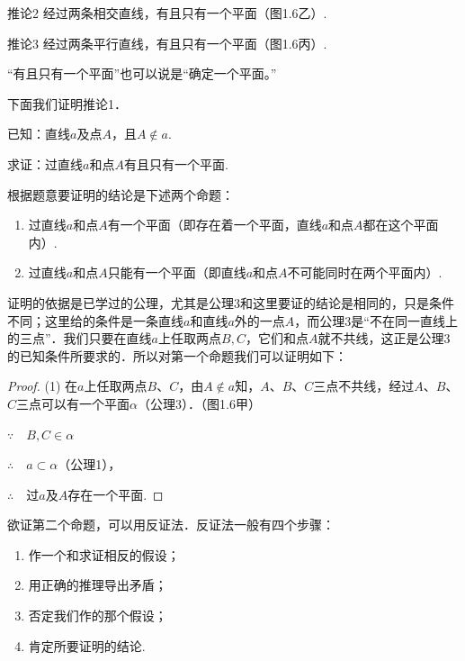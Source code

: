 \begin{thm}
    {推论2} 经过两条相交直线，有且只有一个平面（图1.6乙）.
\end{thm}


\begin{thm}
    {推论3} 经过两条平行直线，有且只有一个平面（图1.6丙）.
\end{thm}


“有且只有一个平面”也可以说是“确定一个平面。”


下面我们证明推论1．

已知：直线$a$及点$A$，且$A\notin a$.

求证：过直线$a$和点$A$有且只有一个平面.

\begin{analyze}
根据题意要证明的结论是下述两个命题：
\begin{enumerate}[(1)]
\item 过直线$a$和点$A$有一个平面（即存在着一个平面，直线$a$和点$A$都在这个平面内）.
\item 过直线$a$和点$A$只能有一个平面（即直线$a$和点$A$不可能同时在两个平面内）.
\end{enumerate}
\end{analyze}

证明的依据是已学过的公理，尤其是公理3和这里要证的结论是相同的，只是条件不同；这里给的条件是一条直线$a$和直线$a$外的一点$A$，而公理3是“不在同一直线上的三点”．我们只要在直线$a$上任取两点$B,C$，它们和点$A$就不共线，这正是公理3的已知条件所要求的．所以对第一个命题我们可以证明如下：

\begin{proof}
(1) 在$a$上任取两点$B$、$C$，由$A\notin a$知，$A$、$B$、$C$三点不共线，经过$A$、$B$、$C$三点可以有一个平面$\alpha$（公理3）．（图1.6甲）

$\because\quad B,C\in \alpha$

$\therefore\quad a\subset \alpha$（公理1），

$\therefore\quad $过$a$及$A$存在一个平面.
\end{proof}

\begin{analyze}
    欲证第二个命题，可以用反证法．反证法一般有四个步骤：
\begin{enumerate}
    \item 作一个和求证相反的假设；
    \item 用正确的推理导出矛盾；
    \item 否定我们作的那个假设；
    \item 肯定所要证明的结论.
\end{enumerate}
\end{analyze}

